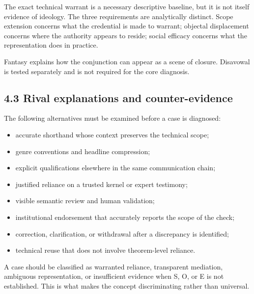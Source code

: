 \documentclass[sn-apa]{sn-jnl}
\begin{document}
The exact technical warrant is a necessary descriptive baseline, but it is not itself evidence of ideology. The three requirements are analytically distinct. Scope extension concerns what the credential is made to warrant; objectal displacement concerns where the authority appears to reside; social efficacy concerns what the representation does in practice.

Fantasy explains how the conjunction can appear as a scene of closure. Disavowal is tested separately and is not required for the core diagnosis.

\subsection{4.3 Rival explanations and counter-evidence}

The following alternatives must be examined before a case is diagnosed:

\begin{itemize}

\item accurate shorthand whose context preserves the technical scope;

\item genre conventions and headline compression;

\item explicit qualifications elsewhere in the same communication chain;

\item justified reliance on a trusted kernel or expert testimony;

\item visible semantic review and human validation;

\item institutional endorsement that accurately reports the scope of the check;

\item correction, clarification, or withdrawal after a discrepancy is identified;

\item technical reuse that does not involve theorem-level reliance.

\end{itemize}

A case should be classified as warranted reliance, transparent mediation, ambiguous representation, or insufficient evidence when S, O, or E is not established. This is what makes the concept discriminating rather than universal.
\end{document}
